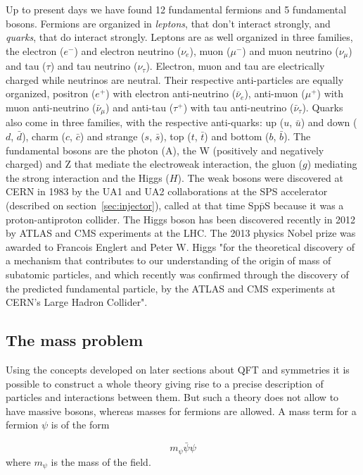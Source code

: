 Up to present days we have found 12 fundamental fermions and 5 fundamental bosons. Fermions are organized in \textit{leptons}, that don't interact strongly, and \textit{quarks}, that do interact strongly. Leptons are as well organized in three families, the electron ($e^{-}$) and electron neutrino ($\nu_{e}$), muon ($\mu^{-}$) and muon neutrino ($\nu_{\mu}$) and tau ($\tau$) and tau neutrino ($\nu_{\tau}$). Electron, muon and tau are electrically charged while neutrinos are neutral. Their respective anti-particles are equally organized, positron ($e^{+}$) with electron anti-neutrino ($\bar{\nu}_{e}$), anti-muon ($\mu^{+}$) with muon anti-neutrino ($\bar{\nu}_{\mu}$) and anti-tau ($\tau^{+}$) with tau anti-neutrino ($\bar{\nu}_{\tau}$). Quarks also come in three families, with the respective anti-quarks: up ($u$, $\bar{u}$) and down ($d$, $\bar{d}$), charm ($c$, $\bar{c}$) and strange ($s$, $\bar{s}$), top ($t$, $\bar{t}$) and bottom ($b$, $\bar{b}$). The fundamental bosons are the photon (A), the W (positively and negatively charged) and Z that mediate the electroweak interaction, the gluon ($g$) mediating the strong interaction and the Higgs ($H$). The weak bosons were discovered at CERN in 1983 by the UA1 and UA2 collaborations at the SPS accelerator (described on section~\ref{sec:injector}), called at that time Sp$\bar{\text{p}}$S because it was a proton-antiproton collider. The Higgs boson has been discovered recently in 2012 by ATLAS and CMS experiments at the LHC. The 2013 physics Nobel prize was awarded to Francois Englert and Peter W. Higgs "for the theoretical discovery of a mechanism that contributes to our understanding of the origin of mass of subatomic particles, and which recently was confirmed through the discovery of the predicted fundamental particle, by the ATLAS and CMS experiments at CERN's Large Hadron Collider".

\subsection{The mass problem}
\label{sec:mass}

Using the concepts developed on later sections about QFT and symmetries it is possible to construct a whole theory giving rise to a precise description of particles and interactions between them. But such a theory does not allow to have massive bosons, whereas masses for fermions are allowed. A mass term for a fermion $\psi$ is of the form 

\begin{equation*}
  m_{\psi}\bar{\psi}\psi
\end{equation*} where $m_{\psi}$ is the mass of the field.

